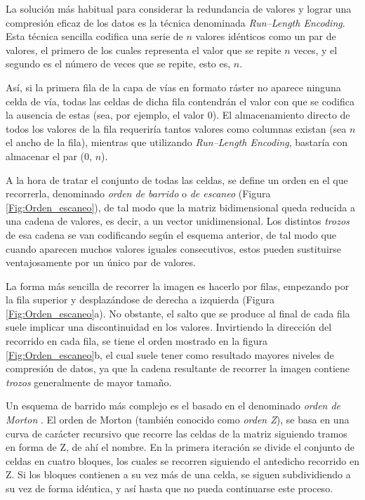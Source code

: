 \begin{multicols}{2}
La solución más habitual para considerar la redundancia de valores y lograr una compresión eficaz de los datos es la técnica denominada \emph{Run--Length Encoding}. Esta técnica sencilla codifica una serie de $n$ valores idénticos como un par de valores, el primero de los cuales representa el valor que se repite $n$ veces, y el segundo es el número de veces que se repite, esto es, $n$. 

Así, si la primera fila de la capa de vías en formato ráster no aparece ninguna celda de vía, todas las celdas de dicha fila contendrán el valor con que se codifica la ausencia de estas (sea, por ejemplo, el valor 0). El almacenamiento directo de todos los valores de la fila requeriría tantos valores como columnas existan (sea $n$ el ancho de la fila), mientras que utilizando \emph{Run--Length Encoding}, bastaría con almacenar el par (0, $n$).

A la hora de tratar el conjunto de todas las celdas, se define un orden en el que recorrerla, denominado \emph{orden de barrido} o \emph{de escaneo} (Figura \ref{Fig:Orden_escaneo}), de tal modo que la matriz bidimensional queda reducida a una cadena de valores, es decir, a un vector unidimensional. Los distintos \emph{trozos} de esa cadena se van codificando según el esquema anterior, de tal modo que cuando aparecen muchos valores iguales consecutivos, estos pueden sustituirse ventajosamente por un único par de valores.

La forma más sencilla de recorrer la imagen es hacerlo por filas, empezando por la fila superior y desplazándose de derecha a izquierda (Figura \ref{Fig:Orden_escaneo}a). No obstante, el salto que se produce al final de cada fila suele implicar una discontinuidad en los valores. Invirtiendo la dirección del recorrido en cada fila, se tiene el orden mostrado en la figura \ref{Fig:Orden_escaneo}b, el cual suele tener como resultado mayores niveles de compresión de datos, ya que la cadena resultante de recorrer la imagen contiene \emph{trozos} generalmente de mayor tamaño.

Un esquema de barrido más complejo es el basado en el denominado \emph{orden de Morton} \cite{Morton1966IBM}. El orden de Morton (también conocido como \emph{orden Z}), se basa en una curva de carácter recursivo que recorre las celdas de la matriz siguiendo tramos en forma de Z, de ahí el nombre. En la primera iteración se divide el conjunto de celdas en cuatro bloques, los cuales se recorren siguiendo el antedicho recorrido en Z. Si los bloques contienen a su vez más de una celda, se siguen subdividiendo a su vez de forma idéntica, y así hasta que no pueda continuarse este proceso.


\end{multicols}
